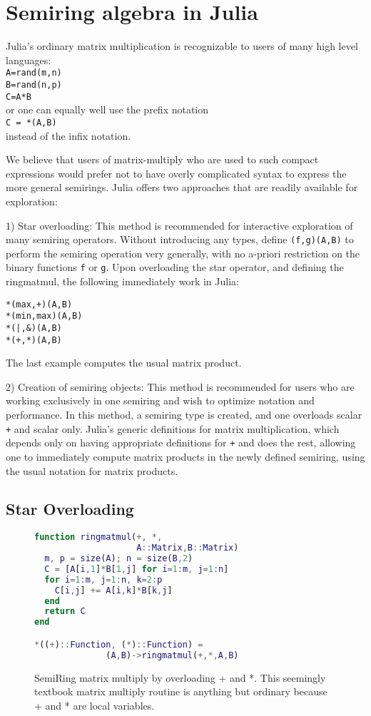 \documentclass[conference]{IEEEtran}
\begin{document}
\section{Semiring algebra in Julia}

Julia's ordinary matrix multiplication is recognizable to users of many
high level languages: \\
{\tt A=rand(m,n) \\  B=rand(n,p) \\ C=A*B } \\
or one can equally well use the prefix notation \\
{\tt C = *(A,B)} \\
instead of the infix notation.

We believe that users of matrix-multiply who are used
to such compact expressions would prefer not to have
overly complicated syntax to express the more general
semirings.  Julia offers two approaches that are readily
available for exploration:

1) Star overloading:
This method is recommended for interactive exploration of many semiring operators.
Without introducing any types, define  {\tt *(f,g)(A,B)} to
perform the semiring operation very generally, with no a-priori restriction
on the binary functions {\tt f} or {\tt g}.   Upon overloading the star operator,
and defining the ringmatmul, the following immediately work in Julia:
\begin{verbatim}
*(max,+)(A,B)
*(min,max)(A,B)
*(|,&)(A,B)
*(+,*)(A,B)
\end{verbatim}
The last example computes the usual matrix product.

2) Creation of semiring objects:
This method is recommended for users who are working exclusively in one semiring and wish to optimize notation and performance.
In this method, a semiring type is created, and one overloads scalar {\tt +} and scalar {\tt *} only.
Julia's generic definitions for matrix multiplication, which depends only on having appropriate definitions for {\tt +} and {\tt *} does the rest, allowing one to immediately compute matrix products in the newly defined semiring, using the usual notation for matrix products.

\subsection{Star Overloading}

\begin{figure}
\begin{lstlisting}[language=matlab, frame=single]
function ringmatmul(+, *, 
                    A::Matrix,B::Matrix)
  m, p = size(A); n = size(B,2)
  C = [A[i,1]*B[1,j] for i=1:m, j=1:n]
  for i=1:m, j=1:n, k=2:p
    C[i,j] += A[i,k]*B[k,j]
  end
  return C
end

*((+)::Function, (*)::Function) = 
              (A,B)->ringmatmul(+,*,A,B)
\end{lstlisting}
\label{fig:ringmm}
\caption{SemiRing matrix multiply by overloading + and *.  This seemingly textbook
matrix multiply routine is anything but ordinary because + and * are local variables.
}
\end{figure}
\end{document}
